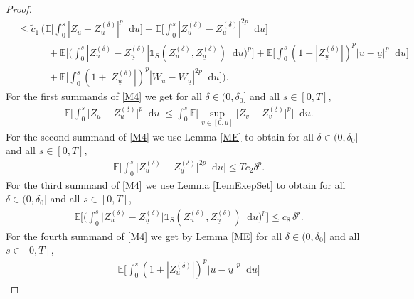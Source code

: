 \documentclass[11pt,a4paper]{article}
\numberwithin{equation}{section}
\theoremstyle{definition}
\newcommand{\E}{{\mathbb{E}}}
\newcommand{\diff}{\mathop{}\!\mathrm{d}}
\begin{document}
\begin{proof}
\begin{equation}
\begin{aligned}
    &\leq \widetilde c_1\, \Big(\E\Big[  \int_0^s  |Z_{u} - Z^{(\delta)}_{u}|^p  \diff u\Big]
    + \E\Big[  \int_0^s  |Z^{(\delta)}_{u} - Z^{(\delta)}_{\underline u} |^{2p} \diff u\Big] \\
    &\quad\quad\quad +\E\Big[ \Big(  \int_0^s   |Z^{(\delta)}_{u} - Z^{(\delta)}_{\underline u}|\mathds{1}_{S}(Z^{(\delta)}_{u},Z^{(\delta)}_{\underline u}) \diff u\Big)^p\Big]
    + \E\Big[ \int_0^s  (1+|Z^{(\delta)}_{\underline u}|)^p |u-\underline u|^p \diff u \Big]\\
    &\quad\quad\quad+ \E\Big[  \int_0^s  (1+|Z^{(\delta)}_{\underline u}|)^p |W_u-W_{\underline u}|^{2p}  \diff u\Big] \Big).
    \end{aligned}
\end{equation}
For the first summands of \eqref{M4} we get for all $\delta\in(0,\delta_0]$ and all $s\in[0,T]$,
\begin{equation}\label{M5}
    \begin{aligned}
    &\E\Big[ \int_0^s  \big|Z_{u} - Z^{(\delta)}_{u}\big|^p \diff u \Big] 
    \leq \int_0^s \E\Big[ \sup_{v\in[0,u]} \big|Z_{v} - Z^{(\delta)}_{v}\big|^p\Big]  \diff u.
    \end{aligned}
\end{equation}
For the second summand of \eqref{M4} we use Lemma \ref{ME} to obtain for all $\delta\in(0,\delta_0]$ and all $s\in[0,T]$,
\begin{equation}\label{M6}
    \begin{aligned}
    &\E\Big[ \int_0^s  \big|Z^{(\delta)}_{u} - Z^{(\delta)}_{\underline u} \big|^{2p} \diff u\Big]
    \leq T c_2 \delta^{p}.
    \end{aligned}
\end{equation}
For the third summand of \eqref{M4} we use Lemma \ref{LemExepSet} to obtain for all $\delta\in(0,\delta_0]$ and all $s\in[0,T]$,
\begin{equation}\label{M7}
    \begin{aligned}
    &\E\Big[\Big( \int_0^s \big|Z^{(\delta)}_{u} - Z^{(\delta)}_{\underline u}\big|\mathds{1}_{S}(Z^{(\delta)}_{u},Z^{(\delta)}_{\underline u}) \diff u\Big)^{p}\Big] \leq c_{8}\, \delta^{p}.
    \end{aligned}
\end{equation}
For the fourth summand of \eqref{M4} we get by Lemma \ref{ME} for all $\delta\in(0,\delta_0]$ and all $s\in[0,T]$, 
\begin{equation}\label{M8}
    \begin{aligned}
    &\E\Big[ \int_0^s (1+|Z^{(\delta)}_{\underline u}|)^p |u-\underline u|^p \diff u\Big]

\end{aligned}
\end{equation}
\end{proof}
\end{document}
